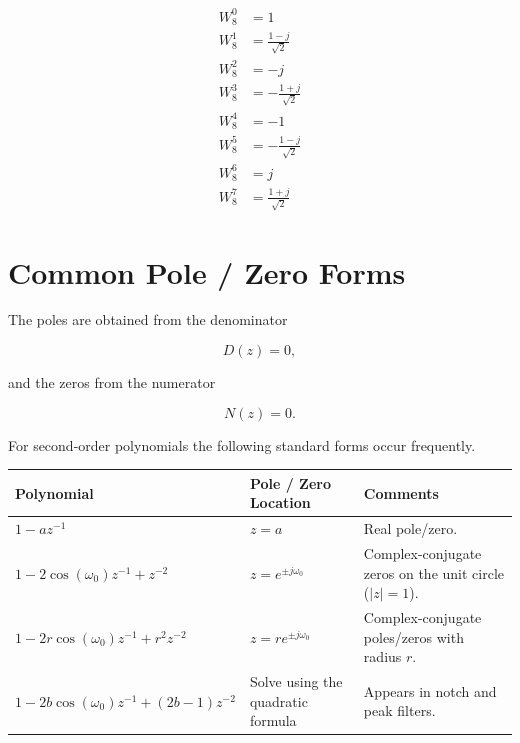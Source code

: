 \[
\begin{aligned}
W_8^0&=1\\
W_8^1&=\frac{1-j}{\sqrt2}\\
W_8^2&=-j\\
W_8^3&=-\frac{1+j}{\sqrt2}\\
W_8^4&=-1\\
W_8^5&=-\frac{1-j}{\sqrt2}\\
W_8^6&=j\\
W_8^7&=\frac{1+j}{\sqrt2}
\end{aligned}
\]
\section{Common Pole / Zero Forms}

The poles are obtained from the denominator

\[
D(z)=0,
\]

and the zeros from the numerator

\[
N(z)=0.
\]

For second-order polynomials the following standard forms occur frequently.

\begin{center}
\renewcommand{\arraystretch}{1.4}
\begin{tabular}{|p{5.4cm}|p{4.8cm}|p{5.8cm}|}
\hline
\textbf{Polynomial} &
\textbf{Pole / Zero Location} &
\textbf{Comments}
\\ \hline

$1-az^{-1}$

&
$z=a$

&
Real pole/zero.
\\ \hline

$1-2\cos(\omega_0)z^{-1}+z^{-2}$

&
$z=e^{\pm j\omega_0}$

&
Complex-conjugate zeros on the unit circle
($|z|=1$).
\\ \hline

$1-2r\cos(\omega_0)z^{-1}+r^2z^{-2}$

&
$z=re^{\pm j\omega_0}$

&
Complex-conjugate poles/zeros with radius $r$.
\\ \hline

$1-2b\cos(\omega_0)z^{-1}
+(2b-1)z^{-2}$

&
Solve using the quadratic formula

&
Appears in notch and peak filters.
\\ \hline

\end{tabular}
\end{center}

